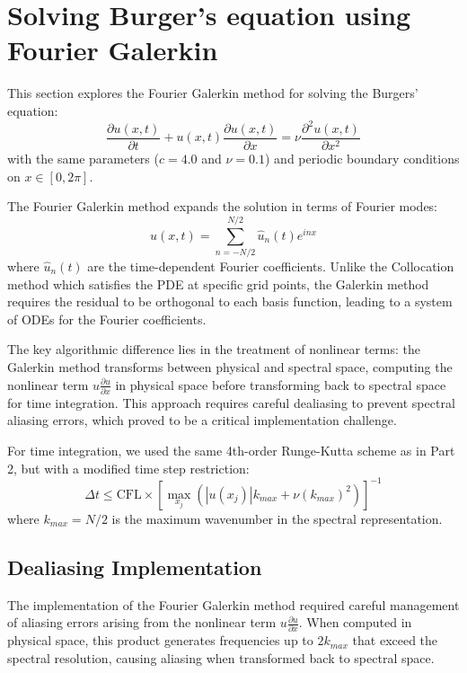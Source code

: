 \section{Solving Burger's equation using Fourier Galerkin}

This section explores the Fourier Galerkin method for solving the Burgers' equation:
\begin{equation}
	\frac{\partial u(x, t)}{\partial t} + u(x, t) \frac{\partial u(x, t)}{\partial x} = \nu \frac{\partial^2 u(x, t)}{\partial x^2}
\end{equation}
with the same parameters ($c = 4.0$ and $\nu = 0.1$) and periodic boundary conditions on $x \in [0, 2\pi]$.

The Fourier Galerkin method expands the solution in terms of Fourier modes:
\begin{equation}
	u(x, t) = \sum_{n=-N/2}^{N/2} \hat{u}_n(t)e^{inx}
\end{equation}
where $\hat{u}_n(t)$ are the time-dependent Fourier coefficients. Unlike the Collocation method which satisfies the PDE at specific grid points, the Galerkin method requires the residual to be orthogonal to each basis function, leading to a system of ODEs for the Fourier coefficients.

The key algorithmic difference lies in the treatment of nonlinear terms: the Galerkin method transforms between physical and spectral space, computing the nonlinear term $u\frac{\partial u}{\partial x}$ in physical space before transforming back to spectral space for time integration. This approach requires careful dealiasing to prevent spectral aliasing errors, which proved to be a critical implementation challenge.

For time integration, we used the same 4th-order Runge-Kutta scheme as in Part 2, but with a modified time step restriction:
\begin{equation}
	\Delta t \leq \text{CFL} \times \left[ \max_{x_j} \left(|u(x_j)| k_{max} + \nu (k_{max})^2  \right)\right]^{-1}
\end{equation}
where $k_{max} = N/2$ is the maximum wavenumber in the spectral representation.

\subsection{Dealiasing Implementation}

The implementation of the Fourier Galerkin method required careful management of aliasing errors arising from the nonlinear term $u\frac{\partial u}{\partial x}$. When computed in physical space, this product generates frequencies up to $2k_{max}$ that exceed the spectral resolution, causing aliasing when transformed back to spectral space.

